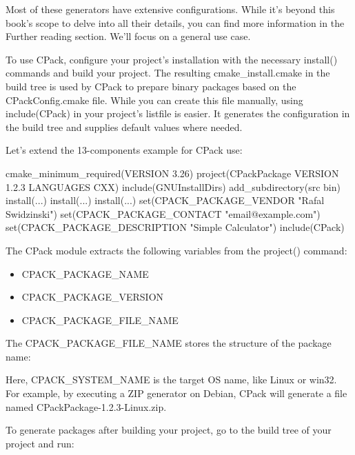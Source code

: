 Most of these generators have extensive configurations. While it’s beyond this book’s scope to delve into all their details, you can find more information in the Further reading section. We’ll focus on a general use case.

To use CPack, configure your project’s installation with the necessary install() commands and build your project. The resulting cmake\_install.cmake in the build tree is used by CPack to prepare binary packages based on the CPackConfig.cmake file. While you can create this file manually, using include(CPack) in your project’s listfile is easier. It generates the configuration in the build tree and supplies default values where needed.

Let’s extend the 13-components example for CPack use:


\begin{cmake}
cmake_minimum_required(VERSION 3.26)
project(CPackPackage VERSION 1.2.3 LANGUAGES CXX)
include(GNUInstallDirs)
add_subdirectory(src bin)
install(...)
install(...)
install(...)
set(CPACK_PACKAGE_VENDOR "Rafal Swidzinski")
set(CPACK_PACKAGE_CONTACT "email@example.com")
set(CPACK_PACKAGE_DESCRIPTION "Simple Calculator")
include(CPack)
\end{cmake}

The CPack module extracts the following variables from the project() command:

\begin{itemize}
\item
CPACK\_PACKAGE\_NAME

\item
CPACK\_PACKAGE\_VERSION

\item
CPACK\_PACKAGE\_FILE\_NAME
\end{itemize}

The CPACK\_PACKAGE\_FILE\_NAME stores the structure of the package name:


Here, CPACK\_SYSTEM\_NAME is the target OS name, like Linux or win32. For example, by executing a ZIP generator on Debian, CPack will generate a file named CPackPackage-1.2.3-Linux.zip.

To generate packages after building your project, go to the build tree of your project and run:

